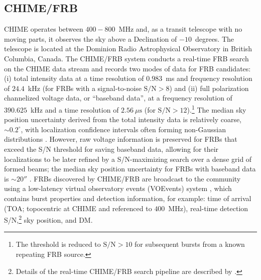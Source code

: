 \documentclass[twocolumn, linenumbers]{aastex701}
\begin{document}
\subsection{CHIME/FRB} \label{sec:obs_chime}
CHIME operates between $400-800$~MHz and, as a transit telescope with no moving parts, it observes the sky above a Declination of $-10$~degrees. The telescope is located at the Dominion Radio Astrophysical Observatory in British Columbia, Canada. The CHIME/FRB system conducts a real-time FRB search on the CHIME data stream \citep[for details, see][]{2018ApJ...863...48C} and records two modes of data for FRB candidates: (i) total intensity data at a time resolution of $0.983$~ms and frequency resolution of $24.4$~kHz (for FRBs with a signal-to-noise $\mathrm{S/N} > 8$) and (ii) full polarization channelized voltage data, or ``baseband data'', at a frequency resolution of $390.625$~kHz and a time resolution of $2.56~\mu\mathrm{s}$ (for $\mathrm{S/N} > 12$).\footnote{The threshold is reduced to $\mathrm{S/N} > 10$ for subsequent bursts from a known repeating FRB source.} The median sky position uncertainty derived from the total intensity data is relatively coarse, $\sim0.2^\circ$, with localization confidence intervals often forming non-Gaussian distributions \citep[for details, see][]{2019ApJ...885L..24C, 2021ApJS..257...59C, FRBCollaboration_2026_arXiv}. However, raw voltage information is preserved for FRBs that exceed the S/N threshold for saving baseband data, allowing for their localizations to be later refined by a S/N-maximizing search over a dense grid of formed beams; the median sky position uncertainty for FRBs with baseband data is $\sim20''$ \citep{Michilli2024}. FRBs discovered by CHIME/FRB are broadcast to the community using a low-latency virtual observatory events (VOEvents) system \citep{2025AJ....169...39A}, which contains burst properties and detection information, for example: time of arrival (TOA; topocentric at CHIME and referenced to $400$~MHz), real-time detection S/N,\footnote{Details of the real-time CHIME/FRB search pipeline are described by \citep{2018ApJ...863...48C}.} sky position, and DM.
\end{document}
